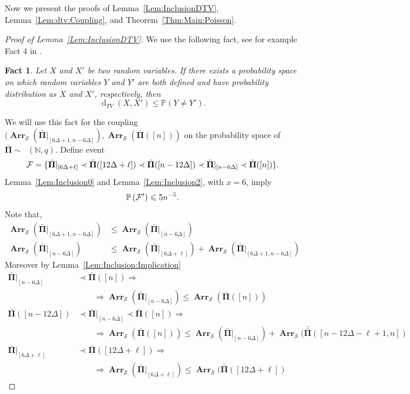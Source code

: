 \documentclass[letterpaper,11pt]{article}
\newtheorem{fact}[theorem]{Fact}
\theoremstyle{definition}
\theoremstyle{remark}
\renewcommand{\le}{\leqslant}
\DeclareMathOperator{\Mallows}{Mallows_{seq}}
\newcommand{\Arr}{\ensuremath{\operatorname{\mathbf{Arr}}}}
\newcommand{\Pra}[1]{\mathbb{P}\left(#1\right)}
\newcommand{\barPi}{\bar {\mathbf \Pi}}
\newcommand{\barbarPi}{{\bar{\bar {\mathbf \Pi}}}}
\newcommand{\NN}{\mathbb{N}}
\newcommand{\cS}{\mathcal{S}}
\newcommand{\dtv}{\operatorname{d}_{TV}}
\newcommand{\subseq}{\prec}
\begin{document}
\medskip

Now we present the proofs of Lemma~\ref{Lem:InclusionDTV}, Lemma~\ref{Lem:dtv:Coupling}, and Theorem~\ref{Thm:Main:Poisson}.

\begin{proof}[Proof of Lemma~\ref{Lem:InclusionDTV}] 
	We use the following fact, see for example Fact 4 in \cite{FillSchSC2000}.
	
	\begin{fact}\label{Fact:dtv}
		Let $X$ and $X'$ be two random variables. If there exists a probability space on which
		random variables $Y$ and $Y'$ are both defined and have probability distribution as $X$ and $X'$,
		respectively, then
		\[\dtv(X,X')\le \Pra{Y\neq Y'}.
		\]
	\end{fact}
	We will use this fact for the coupling $(\Arr_{\cS}(\barPi|_{[6\Delta+1,n-6\Delta]}),\Arr_{\cS}(\barPi([n]))$ on the probability space of $\barPi\sim \Mallows(\NN,q)$.
	Define event
	\begin{equation*}
		{\cal F}=\{\barPi|_{[6\Delta+\ell]}\subseq\barPi([12\Delta+\ell])\subseq\barPi([n-12\Delta])\subseq \barPi|_{[n-6\Delta]}\subseq \barPi([n])\}.
	\end{equation*}
	Lemma~\ref{Lem:Inclusion0} and Lemma~\ref{Lem:Inclusion2}, with $x=6$, imply
	\begin{equation*}
		\Pra{{\cal F}'}\le 5n^{-5}.
	\end{equation*}
	Note that, 
	\begin{align*}
		\Arr_{\cS}(\barPi|_{[6\Delta+1,n-6\Delta]}) &\le \Arr_{\cS}(\barPi|_{[n-6\Delta]})\\
		\Arr_{\cS}(\barPi|_{[n-6\Delta]})&\le \Arr_{\cS}(\barPi|_{[6\Delta+\ell]}) + \Arr_{\cS}(\barPi|_{[6\Delta+1,n-6\Delta]})
	\end{align*}
	Moreover by Lemma~\ref{Lem:Inclusion:Implication}
	\begin{align*}
		\barPi|_{[n-6\Delta]}&\subseq \barPi([n])\Rightarrow\\
		&\quad\quad\Rightarrow \Arr_{\cS}(\barPi|_{[n-6\Delta]})\le \Arr_{\cS}(\barPi([n]))\\ 
		\barPi([n-12\Delta])&\subseq \barPi|_{[n-6\Delta]}\subseq \barPi([n])\Rightarrow\\
		&\quad\quad\Rightarrow\Arr_{\cS}(\barPi([n]))\le \Arr_{\cS}(\barPi|_{[n-6\Delta]})+\Arr_{\cS}(\barbarPi([n-12\Delta-\ell+1,n]) \\ 
		\barPi|_{[6\Delta+\ell]}&\subseq\barPi([12\Delta+\ell])\Rightarrow\\
		&\quad\quad\Rightarrow \Arr_{\cS}(\barPi|_{[6\Delta+\ell]})\le \Arr_{\cS}(\barPi([12\Delta+\ell]) 

\end{align*}
\end{proof}
\end{document}

